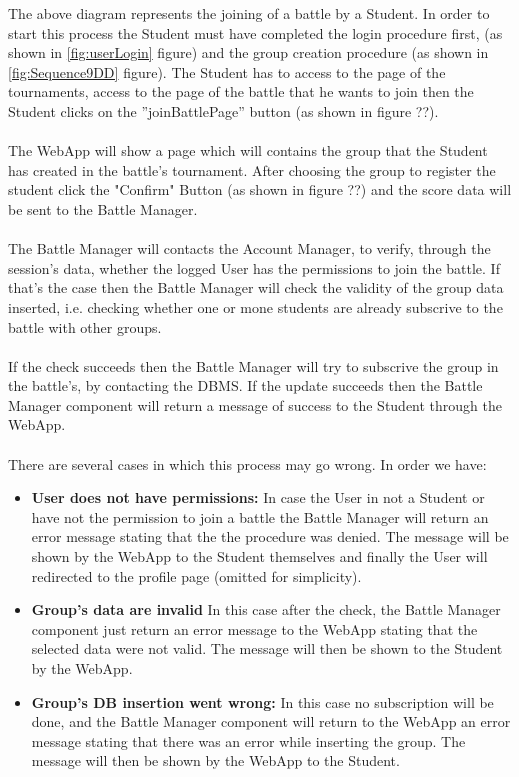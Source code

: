 \documentclass{article}
\begin{document}
{        The above diagram represents the joining of a battle by a Student. 
        In order to start this process the Student must have 
        completed the login procedure first, (as shown in \ref{fig:userLogin} figure) and the
        group creation procedure (as shown in \ref{fig:Sequence9DD} figure). 
        The Student has to access to the page of the tournaments, access 
        to the page of the battle that he wants to join then the Student
        clicks on the ”joinBattlePage” button (as shown in figure ??).
        \\ \\
        The WebApp will show a page which will contains the group that the 
        Student has created in the battle's tournament. After choosing the 
        group to register the student click the "Confirm" Button 
        (as shown in figure ??) and the score data will be sent to the 
        Battle Manager.
        \\ \\
        The Battle Manager will contacts the Account Manager, to verify, 
        through the session’s data, whether the logged User has the 
        permissions to join the battle. If that’s the case then the Battle 
        Manager will check the validity of the group data inserted, i.e. 
        checking whether one or mone students are already subscrive to 
        the battle with other groups.
        \\ \\
        If the check succeeds then the Battle Manager will try to subscrive 
        the group in the battle's, by contacting the DBMS.
        If the update succeeds then the Battle Manager component will 
        return a message of success to the Student through the WebApp.
        \\ \\
        There are several cases in which this process may go wrong. In order we have:
        \begin{itemize}
            \item \textbf{User does not have permissions:} In case the User in not a Student 
            or have not the permission to join a battle the Battle Manager will return an 
            error message stating that the the procedure was denied. The message will be shown 
            by the WebApp to the Student themselves and finally the User will 
            redirected to the profile page (omitted for simplicity).
            \item \textbf{ Group's data are invalid} In this case after the check, the Battle
            Manager component just return an error message to the WebApp stating that
            the selected data were not valid. The message will then be shown to the
            Student by the WebApp.
            \item \textbf{Group's DB insertion went wrong:} In this case no subscription will
            be done, and the Battle Manager component will return to the WebApp 
            an error message stating that there was an error while inserting the group. 
            The message will then be shown by the WebApp to the Student.
        \end{itemize}


}
\end{document}
